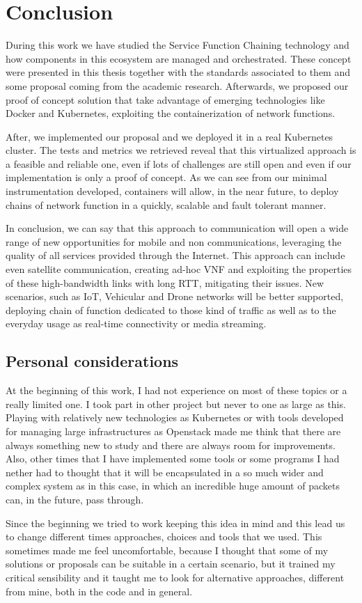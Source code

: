 \chapter{Conclusion}
\label{chap:conclusions}

During this work we have studied the Service Function Chaining
technology and how components in this ecosystem are managed and orchestrated.
These concept were presented in this thesis together with the standards
associated to them and some proposal coming from the academic research.
Afterwards, we proposed our proof of concept solution that take advantage of
emerging technologies like Docker and Kubernetes, exploiting the
containerization of network functions.

After, we implemented our proposal and we deployed it in a real Kubernetes
cluster. The tests and metrics we retrieved reveal that this virtualized
approach is a feasible and reliable one, even if lots of challenges are still
open and even if our implementation is only a proof of concept. As we can see
from our minimal instrumentation developed, containers will allow, in the near
future, to deploy chains of network function in a quickly, scalable and fault
tolerant manner.

In conclusion, we can say that this approach to communication will open a wide
range of new opportunities for mobile and non communications, leveraging the
quality of all services provided through the Internet. This approach can include
even satellite communication, creating ad-hoc VNF and exploiting the properties
of these high-bandwidth links with long RTT, mitigating their issues. New
scenarios, such as IoT, Vehicular and Drone networks will be better supported,
deploying chain of function dedicated to those kind of traffic as well as to the
everyday usage as real-time connectivity or media streaming.

\section*{Personal considerations}
At the beginning of this work, I had not experience on most of these topics
or a really limited one. I took part in other project but never to one as large
as this. Playing with relatively new technologies as Kubernetes or with tools
developed for managing large infrastructures as Openstack made me think that
there are always something new to study and there are always room for
improvements. Also, other times that I have implemented some tools or some
programs I had nether had to thought that it will be encapsulated in a so much
wider and complex system as in this case, in which an incredible huge amount of
packets can, in the future, pass through.

Since the beginning we tried to work keeping this idea in mind and this lead us
to change different times approaches, choices and tools that we used. This
sometimes made me feel uncomfortable, because I thought that some of my
solutions or proposals can be suitable in a certain scenario, but it trained my
critical sensibility and it taught me to look for alternative approaches,
different from mine, both in the code and in general.